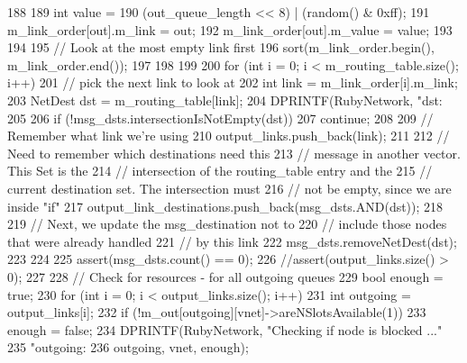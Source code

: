 \begin{DoxyCode}
{{{{{{{{{188                                 }
189                                 int value =
190                                     (out_queue_length << 8) | (random() & 0xff);
191                                 m_link_order[out].m_link = out;
192                                 m_link_order[out].m_value = value;
193                             }
194 
195                             // Look at the most empty link first
196                             sort(m_link_order.begin(), m_link_order.end());
197                         }
198                     }
199 
200                     for (int i = 0; i < m_routing_table.size(); i++) {
201                         // pick the next link to look at
202                         int link = m_link_order[i].m_link;
203                         NetDest dst = m_routing_table[link];
204                         DPRINTF(RubyNetwork, "dst: %
205 
206                         if (!msg_dsts.intersectionIsNotEmpty(dst))
207                             continue;
208 
209                         // Remember what link we're using
210                         output_links.push_back(link);
211 
212                         // Need to remember which destinations need this
213                         // message in another vector.  This Set is the
214                         // intersection of the routing_table entry and the
215                         // current destination set.  The intersection must
216                         // not be empty, since we are inside "if"
217                         output_link_destinations.push_back(msg_dsts.AND(dst));
218 
219                         // Next, we update the msg_destination not to
220                         // include those nodes that were already handled
221                         // by this link
222                         msg_dsts.removeNetDest(dst);
223                     }
224 
225                     assert(msg_dsts.count() == 0);
226                     //assert(output_links.size() > 0);
227 
228                     // Check for resources - for all outgoing queues
229                     bool enough = true;
230                     for (int i = 0; i < output_links.size(); i++) {
231                         int outgoing = output_links[i];
232                         if (!m_out[outgoing][vnet]->areNSlotsAvailable(1))
233                             enough = false;
234                         DPRINTF(RubyNetwork, "Checking if node is blocked ..."
235                                 "outgoing: %
236                                 outgoing, vnet, enough);
}}}}}}
\end{DoxyCode}
